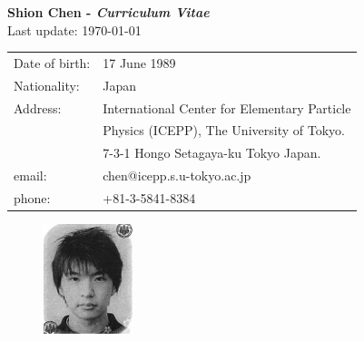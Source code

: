 \documentclass[12pt]{article}
\begin{document}

\begin{center}
  \large{\textbf{Shion Chen  - {\it Curriculum Vitae}   }} \\
  \vspace{2mm}
  \small{Last update: \today} 
\end{center}

\begin{minipage}[t]{.8\textwidth}
    \begin{tabular}{ll}
      Date of birth: & 17 June 1989 \\
      Nationality: & Japan \\
      Address: & International Center for Elementary Particle \\ 
               & Physics (ICEPP), The University of Tokyo. \\
               & 7-3-1 Hongo Setagaya-ku Tokyo Japan. \\
      email: &  chen@icepp.s.u-tokyo.ac.jp \\
      phone: & +81-3-5841-8384 \\
    \end{tabular}
\end{minipage}
\hfill
\begin{minipage}[c]{.15\textwidth}
  \begin{figure}[H]
    \includegraphics{psp_photo_2010.jpg}
  \end{figure}
\end{minipage}
\end{document}
